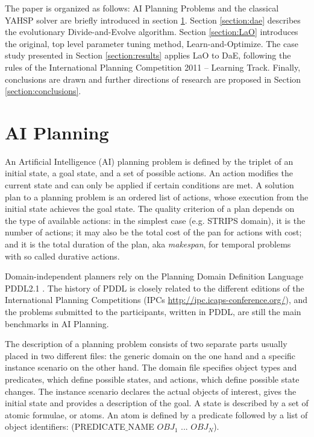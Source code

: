 \documentclass[letterpaper]{article}
\begin{document}
The paper is organized as follows: AI Planning Problems and the classical YAHSP solver are briefly introduced in section \ref{section:planning}. Section \ref{section:dae} describes the evolutionary  Divide-and-Evolve algorithm. Section \ref{section:LaO} introduces the original, top level parameter tuning method, Learn-and-Optimize. The case study presented in Section \ref{section:results} applies LaO to DaE, following the rules of the International Planning Competition 2011 -- Learning Track. Finally, conclusions are drawn and further directions of research are proposed in Section \ref{section:conclusions}. 

\section{AI Planning}
\label{section:planning}

An Artificial Intelligence (AI) planning problem is defined by the triplet of an initial state, a goal state, and a set of possible actions. An action modifies the current state and can only be applied if certain conditions are met. A solution plan to a planning problem is an ordered list of actions, whose execution from the initial state achieves the goal state. The quality criterion of a plan depends on the type of available actions: in the simplest case (e.g. STRIPS domain), it is the number of actions; it may also be the total cost of the pan for actions with cost; and it is the total duration of the plan, aka {\em makespan}, for temporal problems with so called durative actions.

Domain-independent planners rely on the Planning Domain Definition Language PDDL2.1 \cite{Fox-JAIR-2003}. The history of PDDL is closely related to the different editions of the International Planning Competitions (IPCs \url{http://ipc.icaps-conference.org/}), and the problems submitted to the participants, written in PDDL, are still the main benchmarks in AI Planning.

The description of a planning problem consists of two separate parts usually placed in two different files: the generic domain on the one hand and a specific instance scenario on the other hand. The domain file specifies object types and predicates, which define possible states, and actions, which define possible state changes. The instance scenario declares the actual objects of interest, gives the initial state and provides a description of the goal. A state is described by a set of atomic formulae, or atoms. An atom is defined by a predicate followed by a list of object identifiers: (PREDICATE$\_$NAME $OBJ_1$ ... $OBJ_N$). 
\end{document}
